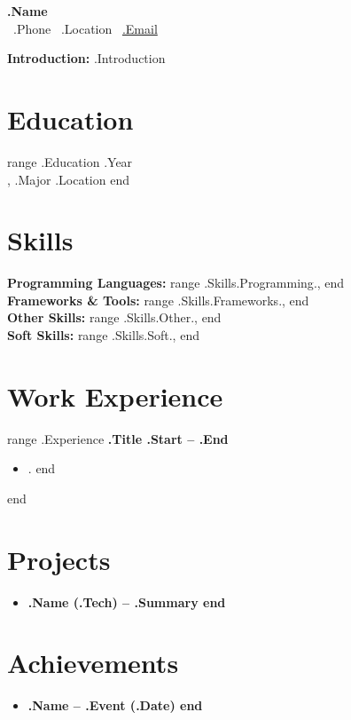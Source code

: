 \documentclass[11pt,a4paper]{article}
\begin{document}
\begin{center}
  {\huge \bf {{.Name}} } \\
    \smallskip
    \faPhone~{{.Phone}} \quad
    \faMapMarker*~{{.Location}} \quad
    \faEnvelope~\href{mailto:{{.Email}}}{{.Email}} \quad
    \href{https://github.com/{{.Github}}}{\faGithub}
\end{center}

\vspace{0.3cm}

\noindent\textbf{Introduction:} {{.Introduction}}

\section*{Education}
{{range .Education}}
 \hfill {{.Year}} \\
, {{.Major}} \hfill {{.Location}}
{{end}}



\section*{Skills}
\textbf{Programming Languages:} {{range .Skills.Programming}}{{.}}, {{end}} \\
\textbf{Frameworks \& Tools:} {{range .Skills.Frameworks}}{{.}}, {{end}} \\
\textbf{Other Skills:} {{range .Skills.Other}}{{.}}, {{end}} \\
\textbf{Soft Skills:} {{range .Skills.Soft}}{{.}}, {{end}}\\

\section*{Work Experience}
{{range .Experience}}
\noindent \bf {{.Title}} \hfill {{.Start}} – {{.End}} \\
\begin{itemize}
{{range .Bullets}}
    \item {{.}}
{{end}}
\end{itemize}
{{end}}

\section*{Projects}
\begin{itemize}
{{range .Projects}}
    \item \bf {{.Name}}  ({{.Tech}}) – {{.Summary}}
{{end}}
\end{itemize}

\section*{Achievements}
\begin{itemize}
{{range .Achievements}}
    \item \bf {{.Name}} – {{.Event}} ({{.Date}})
{{end}}
\end{itemize}
\end{document}
